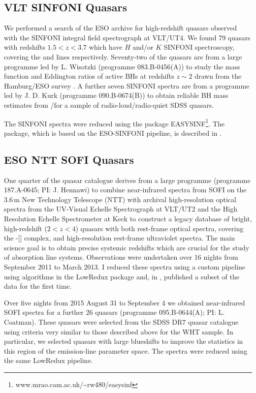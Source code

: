 \subsection{VLT SINFONI Quasars}

We performed a search of the ESO archive for high-redshift quasars observed with the SINFONI  integral  field  spectrograph \citep{eisenhauer03,bonnet04} at VLT/UT4.
We found 79 quasars with redshifts $1.5 < z < 3.7$ which have $H$ and/or $K$ SINFONI spectroscopy, covering the \hb and \ha lines respectively. 
Seventy-two of the quasars are from a large programme led by L. Wisotzki (programme 083.B-0456(A)) to study the mass function and Eddington ratios of active BHs at redshifts $z\sim 2$ drawn from the Hamburg/ESO survey \citep{wisotzki00}.
A further seven SINFONI spectra are from a programme led by  J. D. Kurk (programme 090.B-0674(B)) to obtain reliable BH mass estimates from \hans/\hb for a sample of radio-loud/radio-quiet SDSS quasars.

The SINFONI spectra were reduced using the package EASYSINF\footnote{www.mrao.cam.ac.uk/\textasciitilde rw480/easysinf}.  
The package, which is based on the ESO-SINFONI pipeline, is described in \citet{williams16}. 

\subsection{ESO NTT SOFI Quasars}

One quarter of the quasar catalogue derives from a large programme (programme 187.A-0645; PI: J. Hennawi) to combine near-infrared spectra from SOFI \citep{moorwood98a} on the 3.6\,m New Technology Telescope (NTT) with archival high-resolution optical spectra from the UV-Visual Echelle Spectrograph \citep[UVES;][]{dekker00} at VLT/UT2 and the High Resolution Echelle Spectrometer \citep[HIRES;][]{vogt94} at Keck to construct a legacy database of bright, high-redshift ($2 < z < 4$) quasars with both rest-frame optical spectra, covering the \hbns-[] complex, and high-resolution rest-frame ultraviolet spectra.
The main science goal is to obtain precise systemic redshifts which are crucial for the study of absorption line systems.  
Observations were undertaken over 16 nights from September 2011 to March 2013.
I reduced these spectra using a custom pipeline using algorithms in the LowRedux package and, in \citet{coatman17}, published a subset of the data for the first time. 

Over five nights from 2015 August 31 to September 4 we obtained near-infrared SOFI spectra for a further 26 quasars (programme 095.B-0644(A); PI: L. Coatman). 
These quasars were selected from the SDSS DR7 quasar catalogue using criteria very similar to those described above for the WHT sample. 
In particular, we selected quasars with large  blueshifts to improve the statistics in this region of the  emission-line parameter space. 
The spectra were reduced using the same LowRedux pipeline. 

